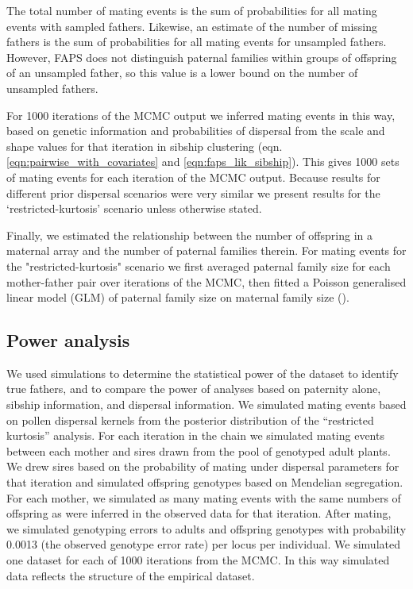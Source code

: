 \documentclass[10pt, a4paper, twocolumn]{article} %
\begin{document}
The total number of mating events is the sum of probabilities for all mating events with sampled fathers. Likewise, an estimate of the number of missing fathers is the sum of probabilities for all mating events for unsampled fathers. However, FAPS does not distinguish paternal families within groups of offspring of an unsampled father, so this value is a lower bound on the number of unsampled fathers.

For 1000 iterations of the MCMC output we inferred mating events in this way, based on genetic information and probabilities of dispersal from the scale and shape values for that iteration in sibship clustering (eqn. \ref{eqn:pairwise_with_covariates} and \ref{eqn:faps_lik_sibship}). This gives 1000 sets of mating events for each iteration of the MCMC output. Because results for different prior dispersal scenarios were very similar we present results for the ‘restricted-kurtosis’ scenario unless otherwise stated.

Finally, we estimated the relationship between the number of offspring in a maternal array and the number of paternal families therein. For mating events for the "restricted-kurtosis" scenario we first averaged paternal family size for each mother-father pair over iterations of the MCMC, then fitted a Poisson generalised linear model (GLM) of paternal family size on maternal family size (\cite{McCullagh1989}).

\subsection{Power analysis}

We used simulations to determine the statistical power of the dataset to identify true fathers, and to compare the power of analyses based on paternity alone, sibship information, and dispersal information. We simulated mating events based on pollen dispersal kernels from the posterior distribution of the “restricted kurtosis” analysis. For each iteration in the chain we simulated mating events between each mother and sires drawn from the pool of genotyped adult plants. We drew sires based on the probability of mating under dispersal parameters for that iteration and simulated offspring genotypes based on Mendelian segregation. For each mother, we simulated as many mating events with the same numbers of offspring as were inferred in the observed data for that iteration. After mating, we simulated genotyping errors to adults and offspring genotypes with probability 0.0013 (the observed genotype error rate) per locus per individual. We simulated one dataset for each of 1000 iterations from the MCMC. In this way simulated data reflects the structure of the empirical dataset.
\end{document}
